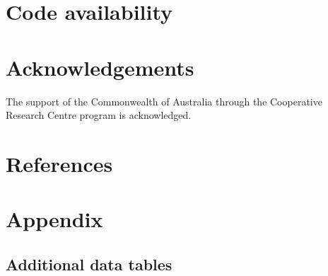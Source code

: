 \documentclass[final,3p,times,authoryear]{elsarticle}
\begin{document}
\section{Code availability}\label{sec:available}

\printglossary[title={List of Symbols}]

\section*{Acknowledgements}
The support of the Commonwealth of Australia through the Cooperative Research Centre program is acknowledged.

\section*{References}\label{sec:ref}
   
  


\begin{thebibliography}{00}


\bibitem[ ()]{}

\end{thebibliography}


\appendix
\setcounter{table}{0}
\renewcommand{\thetable}{A\arabic{table}}



\section{Appendix}\label{sec:app}  
\subsection{Additional data tables}\label{app:tables}  
\end{document}
